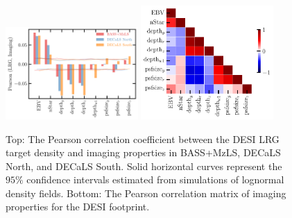 \begin{figure}
\centering
 \includegraphics[width=0.45\textwidth]{figures/pcc.pdf} 
 \includegraphics[width=0.45\textwidth]{figures/pccx.pdf}  
 \caption{Top: The Pearson correlation coefficient between the DESI LRG target density and imaging properties in BASS+MzLS, DECaLS North, and DECaLS South. Solid horizontal curves represent the $95\%$ confidence intervals estimated from simulations of lognormal density fields. Bottom: The Pearson correlation matrix of imaging properties for the DESI footprint.}
 \label{fig:pcc}
\end{figure}

